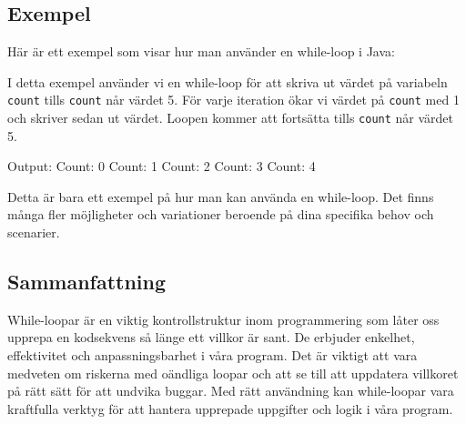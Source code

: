 \hypertarget{exempel}{%
\subsection{Exempel}\label{exempel}}

Här är ett exempel som visar hur man använder en while-loop i Java:

\hypertarget{cb1}{}
\begin{Shaded}
\begin{Highlighting}[]
 \OperatorTok{\{}
       \OperatorTok{(}\OperatorTok{[]}\OperatorTok{)} \OperatorTok{\{}
        \OperatorTok{=} \OperatorTok{;}
         \OperatorTok{(}\OperatorTok{\textless{}} \OperatorTok{)} \OperatorTok{\{}
            \OperatorTok{(} \OperatorTok{+}\OperatorTok{);}
\OperatorTok{++;}
        \OperatorTok{\}}
    \OperatorTok{\}}
\OperatorTok{\}}
\end{Highlighting}
\end{Shaded}

I detta exempel använder vi en while-loop för att skriva ut värdet på
variabeln \texttt{count} tills \texttt{count} når värdet 5. För varje
iteration ökar vi värdet på \texttt{count} med 1 och skriver sedan ut
värdet. Loopen kommer att fortsätta tills \texttt{count} når värdet 5.

Output: Count: 0 Count: 1 Count: 2 Count: 3 Count: 4

Detta är bara ett exempel på hur man kan använda en while-loop. Det
finns många fler möjligheter och variationer beroende på dina specifika
behov och scenarier.

\hypertarget{sammanfattning}{%
\subsection{Sammanfattning}\label{sammanfattning}}

While-loopar är en viktig kontrollstruktur inom programmering som låter
oss upprepa en kodsekvens så länge ett villkor är sant. De erbjuder
enkelhet, effektivitet och anpassningsbarhet i våra program. Det är
viktigt att vara medveten om riskerna med oändliga loopar och att se
till att uppdatera villkoret på rätt sätt för att undvika buggar. Med
rätt användning kan while-loopar vara kraftfulla verktyg för att hantera
upprepade uppgifter och logik i våra program.

